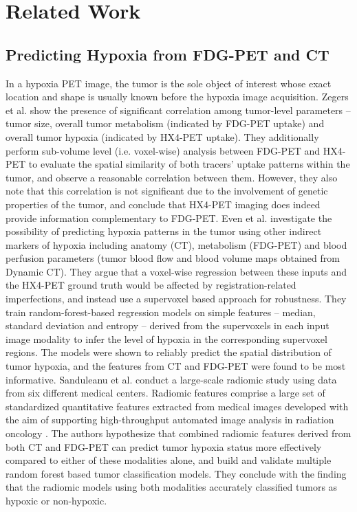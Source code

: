 \chapter{Related Work}
\label{Related_Work}

\section{Predicting Hypoxia from FDG-PET and CT}
\label{Related_Work-hypoxia_prediction}
In a hypoxia PET image, the tumor is the sole object of interest whose exact location and shape is usually known before the hypoxia image acquisition. Zegers et al. \cite{zegers2014vivo} show the presence of significant correlation among tumor-level parameters -- tumor size, overall tumor metabolism (indicated by FDG-PET uptake) and overall tumor hypoxia (indicated by HX4-PET uptake). They additionally perform sub-volume level (i.e. voxel-wise) analysis between FDG-PET and HX4-PET to evaluate the spatial similarity of both tracers' uptake patterns within the tumor, and observe a reasonable correlation between them. However, they also note that this correlation is not significant due to the involvement of genetic properties of the tumor, and conclude that HX4-PET imaging does indeed provide information complementary to FDG-PET. Even et al. \cite{even2017predicting} investigate the possibility of predicting hypoxia patterns in the tumor using other indirect markers of hypoxia including anatomy (CT), metabolism (FDG-PET) and blood perfusion parameters (tumor blood flow and blood volume maps obtained from Dynamic CT). They argue that a voxel-wise regression between these inputs and the HX4-PET ground truth would be affected by registration-related imperfections, and instead use a supervoxel based approach for robustness. They train random-forest-based regression models on simple features -- median, standard deviation and entropy -- derived from the supervoxels in each input image modality to infer the level of hypoxia in the corresponding supervoxel regions. The models were shown to reliably predict the spatial distribution of tumor hypoxia, and the features from CT and FDG-PET were found to be most informative. Sanduleanu et al. \cite{sanduleanu2020non} conduct a large-scale radiomic study using data from six different medical centers. Radiomic features comprise a large set of standardized quantitative features extracted from medical images developed with the aim of supporting high-throughput automated image analysis in radiation oncology \cite{aerts2014decoding}. The authors hypothesize that combined radiomic features derived from both CT and FDG-PET can predict tumor hypoxia status more effectively compared to either of these modalities alone, and build and validate multiple random forest based tumor classification models. They conclude with the finding that the radiomic models using both modalities accurately classified tumors as hypoxic or non-hypoxic.

